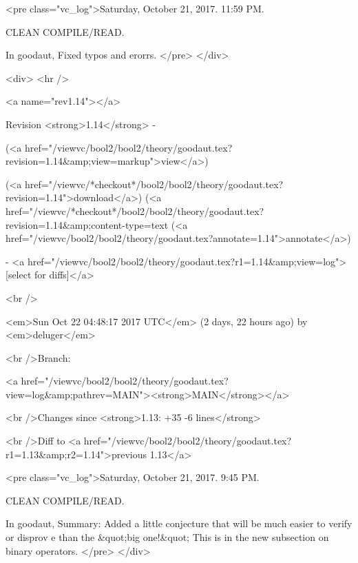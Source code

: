 <pre class="vc_log">Saturday, October 21, 2017.  11:59 PM.

CLEAN COMPILE/READ.

In goodaut,
Fixed typos and erorrs.
</pre>
</div>



<div>
<hr />

<a name="rev1.14"></a>


Revision <strong>1.14</strong> -


(<a href="/viewvc/bool2/bool2/theory/goodaut.tex?revision=1.14&amp;view=markup">view</a>)


(<a href="/viewvc/*checkout*/bool2/bool2/theory/goodaut.tex?revision=1.14">download</a>)
(<a href="/viewvc/*checkout*/bool2/bool2/theory/goodaut.tex?revision=1.14&amp;content-type=text%
(<a href="/viewvc/bool2/bool2/theory/goodaut.tex?annotate=1.14">annotate</a>)



- <a href="/viewvc/bool2/bool2/theory/goodaut.tex?r1=1.14&amp;view=log">[select for diffs]</a>




<br />

<em>Sun Oct 22 04:48:17 2017 UTC</em>
(2 days, 22 hours ago)
by <em>deluger</em>


<br />Branch:

<a href="/viewvc/bool2/bool2/theory/goodaut.tex?view=log&amp;pathrev=MAIN"><strong>MAIN</strong></a>







<br />Changes since <strong>1.13: +35 -6 lines</strong>








<br />Diff to <a href="/viewvc/bool2/bool2/theory/goodaut.tex?r1=1.13&amp;r2=1.14">previous 1.13</a>










<pre class="vc_log">Saturday, October 21, 2017.  9:45 PM.

CLEAN COMPILE/READ.

In goodaut,
Summary: Added a little conjecture that will be much easier to verify or disprov
e than the &quot;big one!&quot;  This is in the new subsection on binary operators.
</pre>
</div>



